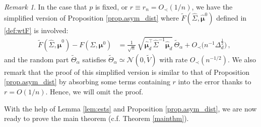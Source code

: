 \documentclass[12pt]{article}
\numberwithin{equation}{section}
\theoremstyle{remark}
\newtheorem{myRem}{Remark}
\newcommand{\1}{{\rm 1}\kern-0.24em{\rm I}}
\begin{document}
\begin{myRem} \label{rmk:simplified SF-F}
In the case that $p$ is fixed, or  $r\equiv r_n=O_\prec(1/n)$, we have the simplified version of Proposition \ref{prop.asym_dist} where $\widetilde{F}(\widehat\Sigma, \hat{\bm{\mu}}^0)$ defined in \eqref{def:wtF} is involved: 
\begin{align}\label{repre:sF-F_s}
\quad \widetilde{F}(\widehat\Sigma, \hat{\bm{\mu}}^0)- F(\Sigma, {\bm{\mu}}^0)
&=\frac {1}{\sqrt n}\, \sqrt{ \hat{\bm{\mu}}_d^{\top}  \widehat\Sigma^{-1} \hat{\bm{\mu}}_d} \, \widetilde {\varTheta}_{\alpha} + O_\prec \big(n^{-1} \varDelta_d^{\frac 12} \big)\,, 
\end{align}
and the random part $\widetilde{\varTheta}_{\alpha}$ satisfies $\widetilde{\varTheta}_{\alpha}\simeq \mathcal{N}(0, \widetilde  {V})$
with rate $O_\prec(n^{-1/2})$. We also remark that the proof of this simplified version  is similar to that of Proposition \ref{prop.asym_dist} by absorbing some terms containing $r$ into the error thanks to $r=O(1/n)$. Hence, we will omit the proof. 

\end{myRem}



With the help of Lemma \ref{lem:ests} and Proposition \ref{prop.asym_dist}, we are now ready to prove the main theorem (c.f. Theorem \ref{mainthm}).
\end{document}
